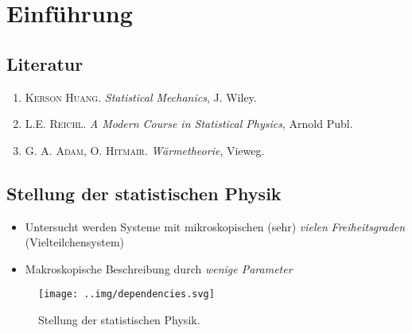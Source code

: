 \section{Einführung}
\subsection{Literatur}
\begin{enumerate}
  \item \textsc{Kerson Huang}. \emph{Statistical Mechanics}, J. Wiley.
  \item \textsc{L.E. Reichl}. \emph{A Modern Course in Statistical Physics}, Arnold Publ.
  \item \textsc{G. A. Adam, O. Hitmair}. \emph{Wärmetheorie}, Vieweg.
\end{enumerate}
\subsection{Stellung der statistischen Physik}
\begin{itemize}
  \item Untersucht werden Systeme mit mikroskopischen (sehr) \emph{vielen} \emph{Freiheitsgraden} \\ 
  		(Vielteilchensystem)
  \item Makroskopische Beschreibung durch \emph{wenige Parameter}
\end{itemize}
\begin{figure}[H]
\begin{center}
  \texttt{[image: ..img/dependencies.svg]}
  \caption{Stellung der statistischen Physik.}
  \label{img:position_statphys}
\end{center}
\end{figure}